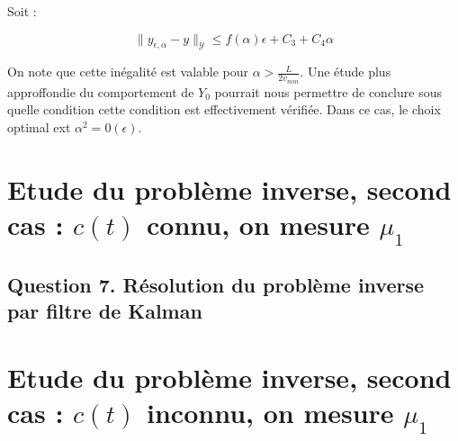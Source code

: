 \documentclass[a4paper]{article}
\newcommand{\Y}{\mathscr{Y}}
\newcommand{\yea}{y_{\epsilon, \alpha}}
\begin{document}
Soit :

\[ \| \yea - y \|_{\Y} \leq f(\alpha) \epsilon + C_3 +C_4 \alpha \]

On note que cette inégalité est valable pour $\alpha > \displaystyle \frac{L}{2 v_{min}}$.
Une étude plus approffondie du comportement de $Y_0$ pourrait nous permettre de conclure sous quelle condition cette condition est effectivement vérifiée.
Dans ce cas, le choix optimal ext $\alpha^2 = 0(\epsilon)$.



\section{Etude du problème inverse, second cas : $c(t)$ connu, on mesure $\mu_1$}

				
\subsection*{Question 7. Résolution du problème inverse par filtre de Kalman}
	
  


\section{Etude du problème inverse, second cas : $c(t)$ inconnu, on mesure $\mu_1$}
\end{document}
